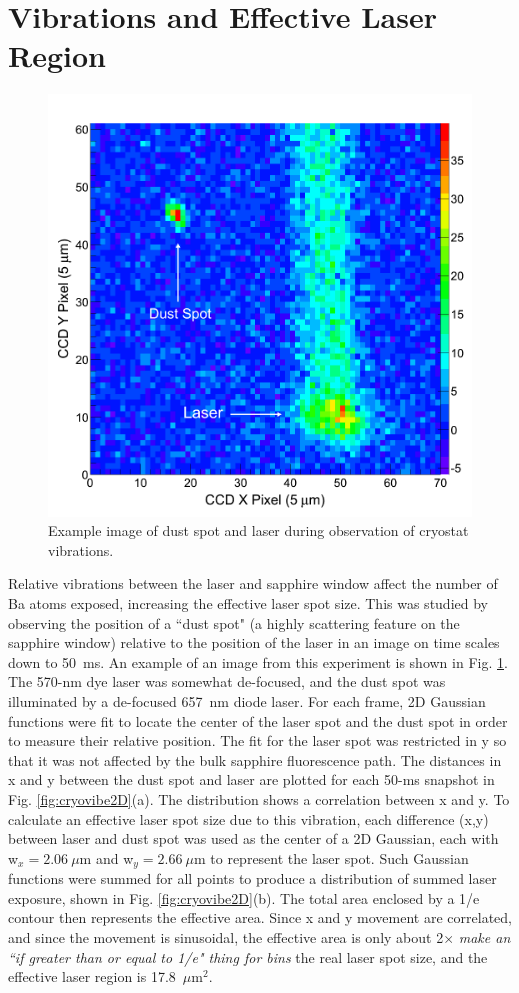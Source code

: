 \section{Vibrations and Effective Laser Region}

\begin{figure} %
        \centering
                \includegraphics[width=.6\textwidth]{figures/image_dustspot.png}
                \caption{Example image of dust spot and laser during observation of cryostat vibrations.}
\label{fig:dustspot}
\end{figure}

Relative vibrations between the laser and sapphire window affect the number of Ba atoms exposed, increasing the effective laser spot size.  This was studied by observing the position of a ``dust spot" (a highly scattering feature on the sapphire window) relative to the position of the laser in an image on time scales down to 50~ms.  An example of an image from this experiment is shown in Fig. \ref{fig:dustspot}.  The 570-nm dye laser was somewhat de-focused, and the dust spot was illuminated by a de-focused 657~nm diode laser. For each frame, 2D Gaussian functions were fit to locate the center of the laser spot and the dust spot in order to measure their relative position.  The fit for the laser spot was restricted in y so that it was not affected by the bulk sapphire fluorescence path.  The distances in x and y between the dust spot and laser are plotted for each 50-ms snapshot in Fig. \ref{fig:cryovibe2D}(a).  The distribution shows a correlation between x and y.  To calculate an effective laser spot size due to this vibration, each difference (x,y) between laser and dust spot was used as the center of a 2D Gaussian, each with w$_{x} = 2.06~\mu$m and w$_{y} = 2.66~\mu$m to represent the laser spot.  Such Gaussian functions were summed for all points to produce a distribution of summed laser exposure, shown in Fig. \ref{fig:cryovibe2D}(b).  The total area enclosed by a 1/e contour then represents the effective area.  Since x and y movement are correlated, and since the movement is sinusoidal, the effective area is only about {\color{red}2$\times$} \emph{\color{gray}make an ``if greater than or equal to 1/e" thing for bins} the real laser spot size, and the effective laser region is {\color{red}17.8~$\mu$m$^{2}$}.

